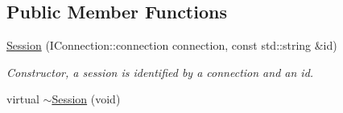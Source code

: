 \subsection*{Public Member Functions}
\begin{DoxyCompactItemize}
\item 
\hyperlink{class_session_a460c79977ab7dda62343e636a82e51e6}{Session} (I\-Connection\-::connection connection, const std\-::string \&id)
\begin{DoxyCompactList}\small\item\em Constructor, a session is identified by a connection and an id. \end{DoxyCompactList}\item 
\hypertarget{class_session_a2e71c82645d1ab93d01381ba6bcb43e8}{virtual \hyperlink{class_session_a2e71c82645d1ab93d01381ba6bcb43e8}{$\sim$\-Session} (void)}\label{class_session_a2e71c82645d1ab93d01381ba6bcb43e8}


\end{DoxyCompactItemize}
